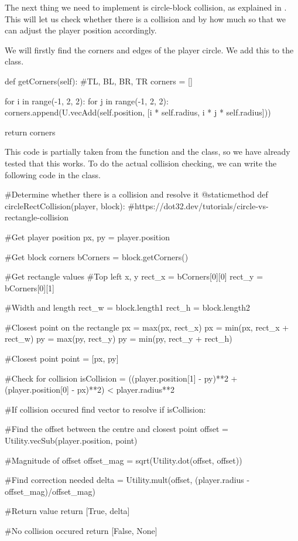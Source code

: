 \vs
The next thing we need to implement is circle-block collision, as explained in \cite{rectangle_circle_collision}. This will let us check whether there is a collision and by how much so that we can adjust the player position accordingly.
\vs

We will firstly find the corners and edges of the player circle. We add this to the  class.

\begin{mpy}
    def getCorners(self):
        #TL, BL, BR, TR
        corners = []

        for i in range(-1, 2, 2):
                for j in range(-1, 2, 2):
                        corners.append(U.vecAdd(self.position, [i * self.radius, i * j * self.radius]))

            return corners
\end{mpy}

This code is partially taken from the  function and the  class, so we have already tested that this works. To do the actual collision checking, we can write the following code in the  class.

\begin{mpy}
    #Determine whether there is a collision and resolve it
    @staticmethod
    def circleRectCollision(player, block):
        #https://dot32.dev/tutorials/circle-vs-rectangle-collision

        #Get player position
        px, py = player.position

        #Get block corners
        bCorners = block.getCorners()
        
        #Get rectangle values
        #Top left x, y
        rect_x = bCorners[0][0]
        rect_y = bCorners[0][1]

        #Width and length
        rect_w = block.length1
        rect_h = block.length2

        #Closest point on the rectangle
        px = max(px, rect_x)
        px = min(px, rect_x + rect_w)
        py = max(py, rect_y)
        py = min(py, rect_y + rect_h)

        #Closest point
        point = [px, py]

        #Check for collision
        isCollision = ((player.position[1] - py)**2 + (player.position[0] - px)**2) < player.radius**2

        #If collision occured find vector to resolve
        if isCollision:

            #Find the offset between the centre and closest point
            offset = Utility.vecSub(player.position, point)

            #Magnitude of offset
            offset_mag = sqrt(Utility.dot(offset, offset))

            #Find correction needed
            delta = Utility.mult(offset, (player.radius - offset_mag)/offset_mag)

            #Return value
            return [True, delta]

        #No collision occured
        return [False, None]
\end{mpy}

